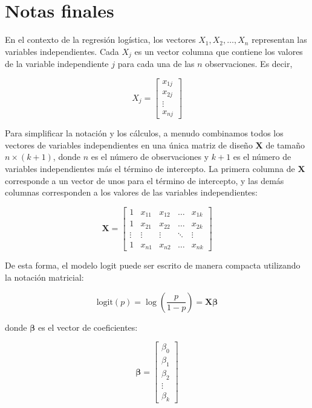 \section{Notas finales}

En el contexto de la regresión logística, los vectores $X_1, X_2, \ldots, X_n$ representan las variables independientes. Cada $X_j$ es un vector columna que contiene los valores de la variable independiente $j$ para cada una de las $n$ observaciones. Es decir,

\begin{equation}
X_j = \begin{bmatrix}
x_{1j} \\
x_{2j} \\
\vdots \\
x_{nj}
\end{bmatrix}
\end{equation}

Para simplificar la notación y los cálculos, a menudo combinamos todos los vectores de variables independientes en una única matriz de diseño $\mathbf{X}$ de tamaño $n \times (k+1)$, donde $n$ es el número de observaciones y $k+1$ es el número de variables independientes más el término de intercepto. La primera columna de $\mathbf{X}$ corresponde a un vector de unos para el término de intercepto, y las demás columnas corresponden a los valores de las variables independientes:

\begin{equation}
\mathbf{X} = \begin{bmatrix}
1 & x_{11} & x_{12} & \ldots & x_{1k} \\
1 & x_{21} & x_{22} & \ldots & x_{2k} \\
\vdots & \vdots & \vdots & \ddots & \vdots \\
1 & x_{n1} & x_{n2} & \ldots & x_{nk}
\end{bmatrix}
\end{equation}

De esta forma, el modelo logit puede ser escrito de manera compacta utilizando la notación matricial:

\begin{equation}
\text{logit}(p) = \log\left(\frac{p}{1-p}\right) = \mathbf{X} \boldsymbol{\beta}
\end{equation}

donde $\boldsymbol{\beta}$ es el vector de coeficientes:

\begin{equation}
\boldsymbol{\beta} = \begin{bmatrix}
\beta_0 \\
\beta_1 \\
\beta_2 \\
\vdots \\
\beta_k
\end{bmatrix}
\end{equation}

